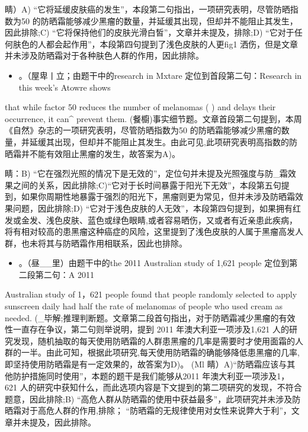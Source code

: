 \documentclass[UTF8,11pt]{ctexart}
\begin{document}
睛）A) “它将延缓皮肤癌的发生”，本段第二句指出，一项研究表明，尽管防晒指数为50 的防晒霜能够减少黑瘤的数量，并延缓其出现，但却并不能阻止其发生，因此排除;C) “它将保持他们的皮肤光滑白皙”，文章并未提及，排除;D) “它对于任何肤色的人都会起作用”，本段第四句提到了浅色皮肤的人更fig1 洒伤，但是文章并未涉及防晒霜对于各种肤色人群的作用，因此排除。


\begin{itemize}[leftmargin=2em,itemsep=.2em,topsep=.4em]\item[A.] 。（屋卑丨立；由题干中的research in Mxtare 定位到首段第二句：Research in this week’s Atowre shows
\end{itemize}

that while factor 50 reduces the number of melanomas ( ) and delays their occurrence, it can\textasciicircum{} prevent them. (餐櫥)事实细节题。文章首段第二句提到，本周《自然》杂志的一项研究表明，尽管防晒指数为50 的防晒霜能够减少黑瘤的数量，并延缓其出现，但却并不能阻止其发生。由此可见,此项研究表明高指数的防晒霜并不能有效阻止黑瘤的发生，故答案为A)。


睛：B) “它在强烈光照的情况下是无效的”，定位句并未提及光照强度与防\_霜效果之间的关系，因此排除;C)“它对于长时间暴露于阳光下无效”，本段第五句提到，如果你周期性地暴露于强烈的阳光下，黑瘤则更为常见，但并未涉及防晒霜效果问题，因此排除;D) “它对于浅色皮肤的人无效”，本段第四句提到，如果拥有红发或金发、浅色皮肤、蓝色或绿色眼睛,或者容易晒伤，又或者有近亲患此疾病，将有相对较高的患黑瘤这种癌症的风险，这里提到了浅色皮肤的人属于黑瘤高发人群，也未将其与防晒霜作用相联系，因此也排除。


\begin{itemize}[leftmargin=2em,itemsep=.2em,topsep=.4em]\item[D.] 。（昼\_\_里）由题干中的the 2011 Australian study of 1,621 people 定位到第二段第二句：A 2011
\end{itemize}

Australian study of 1，621 people found that people randomly selected to apply sunscreen daily had half the rate of melanomas of people who used cream as needed. (\_毕解;推理判断题。文章第二段首句指出，对于防晒霜减少黑瘤的有效性一直存在争议，第二句则举说明，提到 2011 年澳大利亚一项涉及1,621 人的研究发现，随机抽取的每天使用防晒霜的人群患黑瘤的几率是需要时才使用面霜的人群的一半。由此可知，根据此项研究,每天使用防晒霜的确能够降低患黑瘤的几率,即坚持使用防晒霜是有一定效果的，故答案为D)。 (Ml 睛）A)“防晒霜应该与其他防护措施同时使用”，本题的题干是我们能够从2011 年澳大利亚一项涉及1， 621 人的研究中获知什么，而此选项内容是下文提到的第二项研究的发现，不符合题意，因此排除;B) “高危人群从防晒霜的使用中获益最多”，此项研究并未涉及防晒霜对于高危人群的作用,排除； “防晒霜的无规律使用对女性来说弊大于利”，文章并未提及，因此排除。
\end{document}
